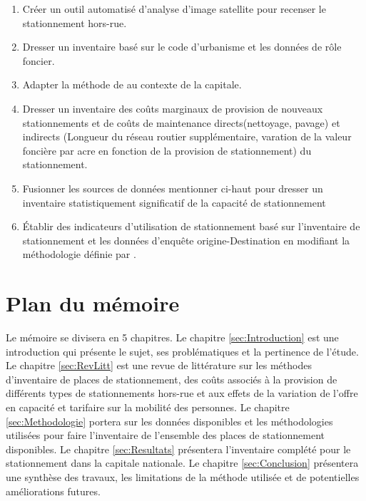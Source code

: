 \begin{enumerate}
\item Créer un outil automatisé d'analyse d'image satellite pour recenser le stationnement hors-rue.
\item Dresser un inventaire basé sur le code d'urbanisme et les données de rôle foncier.
\item Adapter la méthode de \textcite{Bourdeau:MethodologieAnalyse:2014} au contexte de la capitale.
\item Dresser un inventaire des coûts marginaux de provision de nouveaux stationnements et de coûts de maintenance directs(nettoyage, pavage) et indirects (Longueur du réseau routier supplémentaire, varation de la valeur foncière par acre en fonction de la provision de stationnement) du stationnement.
\item Fusionner les sources de données mentionner ci-haut pour dresser un inventaire statistiquement significatif de la capacité de stationnement
\item Établir des indicateurs d'utilisation de stationnement basé sur l'inventaire de stationnement et les données d'enquête origine-Destination en modifiant la méthodologie définie par \textcite{Diallo:MethodologyParking:2015}.
\end{enumerate}

\section{Plan du mémoire}  %

Le mémoire se divisera en 5 chapitres. Le chapitre \ref{sec:Introduction} est une introduction qui présente le sujet, ses problématiques et la pertinence de l'étude. Le chapitre \ref{sec:RevLitt} est une revue de littérature sur les méthodes d'inventaire de places de stationnement, des coûts associés à la provision de différents types de stationnements hors-rue et aux effets de la variation de l'offre en capacité et tarifaire sur la mobilité des personnes. Le chapitre \ref{sec:Methodologie} portera sur les données disponibles et les méthodologies utilisées pour faire l'inventaire de l'ensemble des places de stationnement disponibles. Le chapitre \ref{sec:Resultats} présentera l'inventaire complété pour le stationnement dans la capitale nationale. Le chapitre \ref{sec:Conclusion} présentera une synthèse des travaux, les limitations de la méthode utilisée et de potentielles améliorations futures.

\clearpage
